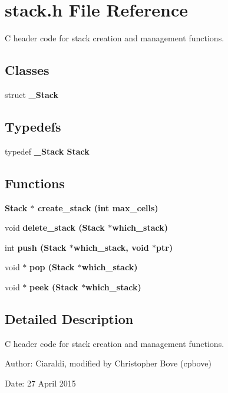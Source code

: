 \section{stack.h File Reference}
\label{stack_8h}
C header code for stack creation and management functions. 

\subsection*{Classes}
\begin{CompactItemize}
\item 
struct \bf{\_\-Stack}
\end{CompactItemize}
\subsection*{Typedefs}
\begin{CompactItemize}
\item 
typedef \bf{\_\-Stack} \bf{Stack}
\end{CompactItemize}
\subsection*{Functions}
\begin{CompactItemize}
\item 
\bf{Stack} $\ast$ \bf{create\_\-stack} (int max\_\-cells)
\item 
void \bf{delete\_\-stack} (\bf{Stack} $\ast$which\_\-stack)
\item 
int \bf{push} (\bf{Stack} $\ast$which\_\-stack, void $\ast$ptr)
\item 
void $\ast$ \bf{pop} (\bf{Stack} $\ast$which\_\-stack)
\item 
void $\ast$ \bf{peek} (\bf{Stack} $\ast$which\_\-stack)
\end{CompactItemize}


\subsection{Detailed Description}
C header code for stack creation and management functions. 

\begin{Desc}
\item[Author:]Ciaraldi, modified by Christopher Bove (cpbove) \end{Desc}
\begin{Desc}
\item[Date:]27 April 2015 \end{Desc}


